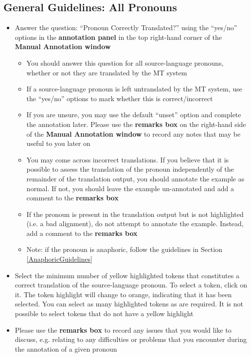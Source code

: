 \documentclass[11pt]{article} %
\begin{document}
\subsection{General Guidelines: All Pronouns}

\begin{itemize}
  \item Answer the question: ``Pronoun Correctly Translated?'' using the ``yes/no'' options in the \textbf{annotation panel} in the top right-hand corner of the \textbf{Manual Annotation window}
  \begin{itemize}
    \item You should answer this question for all source-language pronouns, whether or not they are translated by the MT system
    \item If a source-language pronoun is left untranslated by the MT system, use the ``yes/no'' options to mark whether this is correct/incorrect
    \item If you are unsure, you may use the default ``unset'' option and complete the annotation later. Please use the \textbf{remarks box} on the right-hand side of the \textbf{Manual Annotation window} to record any notes that may be useful to you later on
    \item You may come across incorrect translations. If you believe that it is possible to assess the translation of the pronoun independently of the remainder of the translation output, you should annotate the example as normal. If not, you should leave the example un-annotated and add a comment to the \textbf{remarks box}
    \item If the pronoun is present in the translation output but is not highlighted (i.e. a bad alignment), do not attempt to annotate the example. Instead, add a comment to the \textbf{remarks box}
    \item Note: if the pronoun is anaphoric, follow the guidelines in Section \ref{AnaphoricGuidelines}
  \end{itemize}
  \item Select the minimum number of yellow highlighted tokens that constitutes a correct translation of the source-language pronoun. To select a token, click on it. The token highlight will change to orange, indicating that it has been selected. You can select as many highlighted tokens as are required. It is not possible to select tokens that do not have a yellow highlight
  \item Please use the \textbf{remarks box} to record any issues that you would like to discuss, e.g. relating to any difficulties or problems that you encounter during the annotation of a given pronoun

\end{itemize}
\end{document}
